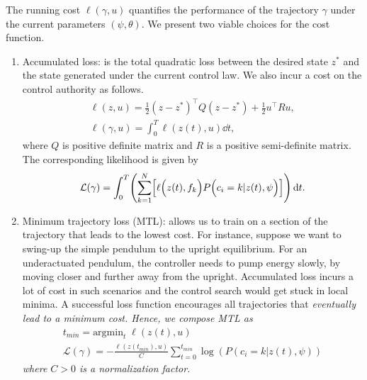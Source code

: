 The running cost $\ell(\gamma, u)$ quantifies the performance of the trajectory
$\gamma$ under the current parameters $(\psi, \theta)$.
%
We present two viable choices for the cost function. 
\begin{enumerate}
    \item Accumulated loss: is the total quadratic loss between the desired
    state $z^*$ and the state generated under the current control law. We also
    incur a cost on the control authority as follows.
    \begin{equation}
        \begin{gathered}
            \ell(z, u) = \frac{1}{2}(z - z^*)^\top Q (z - z^*) + \frac{1}{2} u^\top R u , \\
            \ell(\gamma, u) = \int_0^{T}  \ell(z(t), u)\dd t,
        \end{gathered}
    \label{eq:accumulatedLoss}
    \end{equation}
    \noindent where $Q$ is positive definite matrix and $R$ is a positive semi-definite matrix.
    The corresponding likelihood is given by 
    \begin{align}
        \mathcal{L}(\gamma) = \int_{0}^{T} \Biggl( \sum_{k=1}^{N} \Bigl[ \ell \Bigl(z(t), f_k \Bigr) P\Bigl(c_i = k | z(t), \psi \Bigr) \Bigr] \Biggr) \operatorname{d}\! t.
        \label{eq:accumulated_likelihood}
    \end{align}
    \item Minimum trajectory loss (MTL): allows us to train on a section of the
    trajectory that leads to the lowest cost.
    For instance, suppose we want to swing-up the simple pendulum to the upright
    equilibrium. 
    For an underactuated pendulum, the controller needs to pump energy slowly,
    by moving closer and further away from the upright.
    Accumulated loss incurs a lot of cost in such scenarios and the control
    search would get stuck in local minima.
    A successful loss function encourages all trajectories that \it{eventually}
    \normalfont lead to a minimum cost.
    Hence, we compose MTL as
    \begin{equation}
        \begin{gathered}
            t_{min} = \text{argmin}_{t} \; \ell(z(t), u)  \\
            \mathcal{L}(\gamma) = - \frac{\ell(z(t_{min}), u)}{C} \sum_{t=0}^{t_{min}} \log(P(c_i=k| z(t), \psi)) 
        \end{gathered} 
    \end{equation}
    \noindent where $C > 0$ is a normalization factor.

\end{enumerate}

